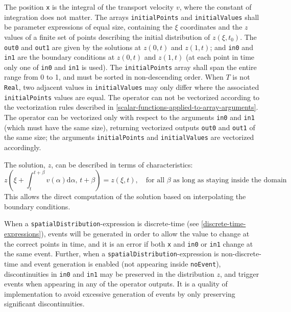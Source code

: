 The position \lstinline!x! is the integral of the transport velocity $v$, where the constant of integration does not matter.
The arrays \lstinline!initialPoints! and \lstinline!initialValues! shall be parameter expressions of equal size, containing the $\xi$ coordinates and the $z$ values of a finite set of points describing the initial distribution of $z(\xi, t_{0})$.
The \lstinline!out0! and \lstinline!out1! are given by the solutions at $z(0, t)$ and $z(1, t)$; and \lstinline!in0! and \lstinline!in1! are the boundary conditions at $z(0, t)$ and $z(1, t)$ (at each point in time only one of \lstinline!in0! and \lstinline!in1! is used).
The \lstinline!initialPoints! array shall span the entire range from 0 to 1, and must be sorted in non-descending order.
When $T$ is not \lstinline!Real!, two adjacent values in \lstinline!initialValues! may only differ where the associated \lstinline!initialPoints! values are equal.
The operator can not be vectorized according to the vectorization rules described in \cref{scalar-functions-applied-to-array-arguments}.
The operator can be vectorized only with respect to the arguments \lstinline!in0! and \lstinline!in1! (which must have the same size), returning vectorized outputs \lstinline!out0! and \lstinline!out1! of the same size; the arguments \lstinline!initialPoints! and \lstinline!initialValues! are vectorized accordingly.

The solution, $z$, can be described in terms of characteristics:
\begin{equation*}
z(\xi+\int_{t}^{t+\beta}\! v(\alpha) \mathrm{d}\alpha,\, t+\beta) = z(\xi, t), \quad\text{for all $\beta$ as long as staying inside the domain}
\end{equation*}
This allows the direct computation of the solution based on interpolating the boundary conditions.

When a \lstinline!spatialDistribution!-expression is discrete-time (see \cref{discrete-time-expressions}), events will be generated in order to allow the value to change at the correct points in time, and it is an error if both \lstinline!x! and \lstinline!in0! or \lstinline!in1! change at the same event.
Further, when a \lstinline!spatialDistribution!-expression is non-discrete-time and event generation is enabled (not appearing inside \lstinline!noEvent!), discontinuities in \lstinline!in0! and \lstinline!in1! may be preserved in the distribution $z$, and trigger events when appearing in any of the operator outputs.
It is a quality of implementation to avoid excessive generation of events by only preserving significant discontinuities.

